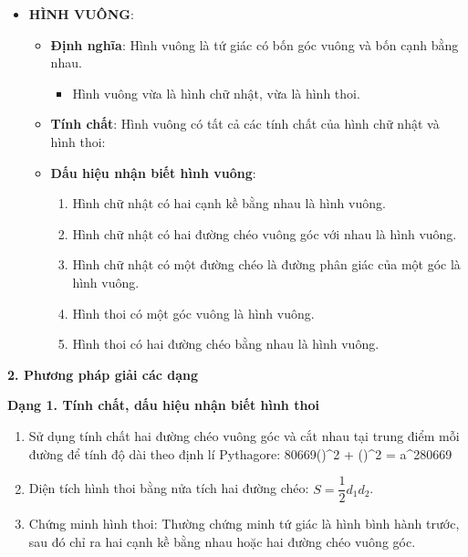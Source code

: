 \begin{itemize}
\item \textbf{HÌNH VUÔNG}:
\begin{itemize}
\item \textbf{Định nghĩa}: Hình vuông là tứ giác có bốn góc vuông và bốn cạnh bằng nhau.
\begin{itemize}
\item Hình vuông vừa là hình chữ nhật, vừa là hình thoi.
\end{itemize}
\item \textbf{Tính chất}: Hình vuông có tất cả các tính chất của hình chữ nhật và hình thoi:
\item \textbf{Dấu hiệu nhận biết hình vuông}:
\begin{enumerate}
\item Hình chữ nhật có hai cạnh kề bằng nhau là hình vuông.
\item Hình chữ nhật có hai đường chéo vuông góc với nhau là hình vuông.
\item Hình chữ nhật có một đường chéo là đường phân giác của một góc là hình vuông.
\item Hình thoi có một góc vuông là hình vuông.
\item Hình thoi có hai đường chéo bằng nhau là hình vuông.
\end{enumerate}
\end{itemize}
\end{itemize}

\textbf{2. Phương pháp giải các dạng}

\textbf{Dạng 1. Tính chất, dấu hiệu nhận biết hình thoi}
\begin{enumerate}
\item Sử dụng tính chất hai đường chéo vuông góc và cắt nhau tại trung điểm mỗi đường để tính độ dài theo định lí Pythagore:
80669\left(\right)^2 + \left(\right)^2 = a^280669
\item Diện tích hình thoi bằng nửa tích hai đường chéo: $$.
\item Chứng minh hình thoi: Thường chứng minh tứ giác là hình bình hành trước, sau đó chỉ ra hai cạnh kề bằng nhau hoặc hai đường chéo vuông góc.
\end{enumerate}

